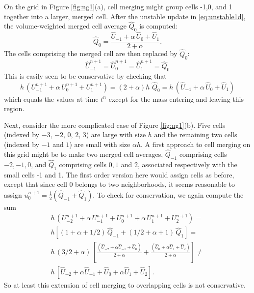 On the grid in Figure \ref{fig:ng1}(a), cell merging might 
group cells -1,0, and 1 together into a larger, merged cell.
After the unstable update in \eqref{eq:unstable1d}, the  volume-weighted
merged cell average $\widehat{Q}_0$ is computed:
\begin{equation}
\widehat{Q}_0 = \frac{\widehat{U}_{-1} + \alpha \,  \widehat{U}_0 + 
\widehat{U}_1}{2+\alpha} .
\end{equation}
The cells comprising the merged cell
are then replaced by $\widehat{Q}_0$:
\begin{equation}
\widehat{U}_{-1}^{n+1} = \widehat{U}_0^{n+1} = \widehat{U}_1^{n+1} =
\widehat{Q}_0
\end{equation}
This is easily seen to be conservative by checking that
\begin{equation}
h \, (U_{-1}^{n+1} + \alpha \, U_0^{n+1} + U_1^{n+1})
= (2+\alpha) h \,  \, \widehat{Q}_0 =
 h \, (\widehat{U}_{-1} + \alpha \, \widehat{U}_{0} +  \widehat{U}_{1})
\end{equation}
which equals the values at time $t^n$  except for the mass entering and
leaving this region.


Next, consider the more complicated case of Figure \ref{fig:ng1}(b).
Five cells (indexed by $-3$, $-2$, $0$, $2$, $3$) are large 
with size $h$ and the remaining two cells (indexed by $-1$ and $1$) 
are small with size $\alpha h$.
A first approach to cell merging on this grid
might be to make two merged cell averages, $\widehat{Q}_{-1}$
comprising cells ${-2},{-1},0$, and $\widehat{Q}_1$ comprising cells
$0, 1$ and $2$, associated respectively with the small cells -1 and 1.
The first order version here would assign cells as before, except that
since cell 0 belongs to two neighborhoods, it seems  reasonable
to assign $u_0^{n+1} = \frac{1}{2} (\widehat{Q}_{-1} + \widehat{Q}_1).$  
To check for conservation, we again compute the sum
\begin{equation}
\begin{split}
h \, (U_{-2}^{n+1} + \alpha\,U_{-1}^{n+1} + U_0^{n+1} + \alpha \, U_1^{n+1}
+ U_2^{n+1}) = \\[.08in]
h [(1+\alpha +1/2) \, \widehat{Q}_{-1} +
 (1/2+\alpha +1) \, \widehat{Q}_{1}]  = \\[.08in]
h \,  (3/2+\alpha) \, [ \frac{(\widehat{U}_{-2} + \alpha \widehat{U}_{-1} +
\widehat{U}_0)}{2+\alpha} +
        \frac{(\widehat{U}_{0} + \alpha \widehat{U}_{1} 
        + \widehat{U}_2)}{2+\alpha} ]  \neq \\[.08in]
h \,  [ \widehat{U}_{-2} + \alpha \widehat{U}_{-1} +
\widehat{U}_0 +  \alpha \widehat{U}_{1} + \widehat{U}_2 ].  
\end{split}
\end{equation}
So at least this extension of cell merging to overlapping cells is not
conservative.

